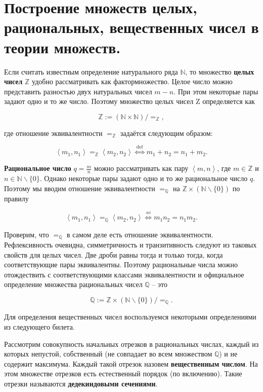 \section{Построение множеств целых, рациональных, вещественных чисел в теории множеств.}

\begin{definition}
Если считать известным определение натурального ряда $\mathbb{N}$, то множество \textbf{целых чисел} $\mathbb{Z}$
	удобно рассматривать как фактормножество. Целое число можно представить разностью двух натуральных чисел $m-n$.
	При этом некоторые пары задают одно и то же число. Поэтому множество целых чисел Z определяется как

$$
\mathbb{Z}:=(\mathbb{N} \times \mathbb{N}) /=_{\mathbb{Z}},
$$

где отношение эквивалентности $=_{\mathbb{Z}}$ задаётся следующим образом:

$$
\left\langle m_{1}, n_{1}\right\rangle=_{\mathbb{Z}}\left\langle m_{2}, n_{2}\right\rangle \stackrel{\text { def
	}}{\Longleftrightarrow} m_{1}+n_{2}=n_{1}+m_{2}.
$$
\end{definition}

\begin{definition}
\textbf{Рациональное число} $q = \frac{m}{n}$ можно рассматривать как пару $\left\langle m, n\right\rangle$, где $m
	\in \mathbb{Z}$ и $n \in \mathbb{N} \backslash \{0\}$. Однако некоторые пары задают одно и то же рациональное
	число $q$. Поэтому мы вводим отношение эквивалентности $=_{\mathbb{Q}}$ на $\mathbb{Z} \times(\mathbb{N}
	\backslash\{0\})$ по правилу

$$
\left\langle m_1, n_1 \right \rangle=_{\mathbb{Q}} \left \langle m_{2}, n_{2}\right \rangle
	\overset{\underset{\mathrm{def}}{}}{\Longleftrightarrow} m_{1} n_{2}=n_{1} m_{2}.
$$

Проверим, что $=_{\mathbb{Q}}$ в самом деле есть отношение эквивалентности. Рефлексивность очевидна, симметричность
	и транзитивность следуют из таковых свойств для целых чисел. Две дроби равны тогда и только тогда, когда
	соответствующие пары эквивалентны. Поэтому рациональные числа можно отождествить с соответствующими классами
	эквивалентности и официальное определение множества рациональных чисел $\mathbb{Q}$ -- это

$$
\mathbb{Q}:=\mathbb{Z} \times(\mathbb{N} \backslash\{0\}) /=_{\mathbb{Q}}.
$$
\end{definition}

Для определения вещественных чисел воспользуемся некоторыми определениями из следующего билета.

\begin{definition}
Рассмотрим совокупность начальных отрезков в рациональных числах, каждый из которых непустой, собственный (не
	совпадает во всем множеством $\mathbb{Q}$) и не содержит максимума. Каждый такой отрезок назовем
	\textbf{вещественным числом}. На этом множестве отрезков есть естественный порядок (по включению). Такие
	отрезки называются \textbf{дедекиндовыми сечениями}.
\end{definition}

